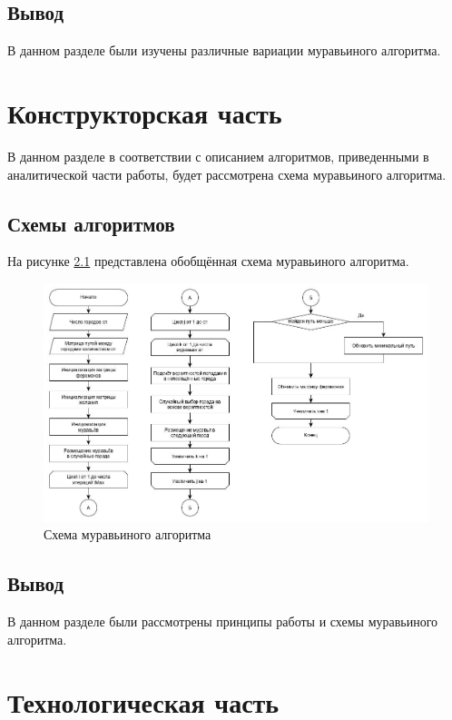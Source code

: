 \documentclass[12pt, a4paper]{report}
\begin{document}
	\section{Вывод}
	
	В данном разделе были изучены различные вариации муравьиного алгоритма.

	\chapter{Конструкторская часть}
	
	В данном разделе в соответствии с описанием алгоритмов, приведенными в аналитической части работы, будет рассмотрена схема муравьиного
	алгоритма.
	
	\section{Схемы алгоритмов}
	
	На рисунке \ref{ris:aco} представлена обобщённая схема муравьиного алгоритма.
	
	\begin{figure}[ht!]
		\center
		\includegraphics[scale=0.5]{img/aco.jpg}
		\caption{Схема муравьиного алгоритма}
		\label{ris:aco}
	\end{figure}

	\section{Вывод}
	
	В данном разделе были рассмотрены принципы работы и схемы муравьиного алгоритма.
	
    \chapter{Технологическая часть}
    
\end{document}
